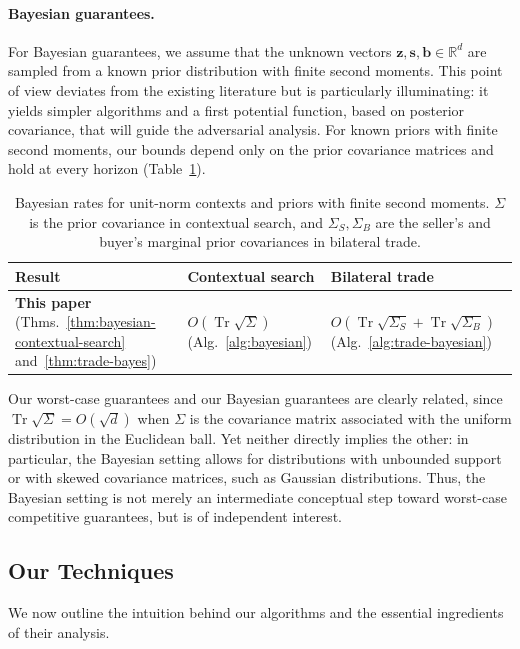 \documentclass[11pt]{article}
\newcommand{\Rbb}{\mathbb R}
\DeclareMathOperator{\Tr}{Tr}
\newcommand{\bs}{\boldsymbol s}
\newcommand{\bb}{\boldsymbol b}
\newcommand{\bz}{\boldsymbol z}
\begin{document}
\paragraph{Bayesian guarantees.} For Bayesian guarantees, we assume that the unknown vectors $\bz, \bs, \bb \in \Rbb^d$ are sampled from a known prior distribution with finite second moments. This point of view deviates from the existing literature but is particularly illuminating: it yields simpler algorithms and a first potential function, based on posterior covariance, that will guide the adversarial analysis. For known priors with finite second moments, our bounds depend only on the prior covariance matrices and hold at every horizon (Table~\ref{tab:bayesian-results}). 


\begin{table}[htbp]
\centering
\setlength{\tabcolsep}{10pt}
\renewcommand{\arraystretch}{1.35}
\begin{tabular}{lll}
\hline
Result & Contextual search & Bilateral trade \\
\hline
\textbf{This paper} (Thms.~\ref{thm:bayesian-contextual-search} and~\ref{thm:trade-bayes}) & $O(\Tr\sqrt{\Sigma})$ (Alg.~\ref{alg:bayesian})& $O(\Tr\sqrt{\Sigma_S}+\Tr\sqrt{\Sigma_B})$ (Alg.~\ref{alg:trade-bayesian}) \\
\hline
\end{tabular}
\caption{Bayesian rates for unit-norm contexts and priors with finite second moments. $\Sigma$ is {the prior covariance in contextual search}, and $\Sigma_S,\Sigma_B$ are the seller's and buyer's marginal prior covariances in bilateral trade. }
\label{tab:bayesian-results}
\end{table}

Our worst-case guarantees and our Bayesian guarantees are clearly
related, since $\Tr\sqrt{\Sigma}= O(\sqrt d)$ when $\Sigma$ is the
covariance matrix {associated with} the uniform distribution in the
Euclidean ball. Yet neither directly implies the other: in particular,
the Bayesian setting allows for distributions with unbounded support
or with skewed covariance matrices, such as Gaussian
distributions. Thus, the Bayesian setting is not merely an
{intermediate} conceptual step toward worst-case competitive guarantees,
but is of independent interest.

\subsection{Our Techniques}

{We now outline the intuition behind our algorithms and the essential
ingredients of their analysis.}
\end{document}
